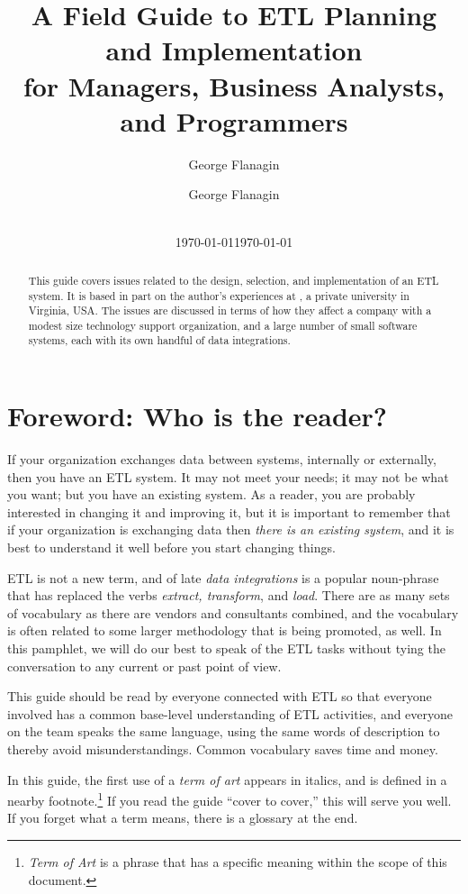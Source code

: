\documentclass[11pt,letterpaper,twosided]{memoir}
\author{George Flanagin}
\date{\today}
\title{A Field Guide to ETL Planning and Implementation\\
\large for Managers, Business Analysts, and Programmers}
\author{George Flanagin\\
\normalsize\lit{gflanagin@richmond.edu}~\lit{me@georgeflanagin.com}}
\date{\today}
\begin{document}
\sloppybottom
\maketitle
\begin{abstract}
This guide covers issues related to the design, selection,
and implementation of an ETL system. It is based in part on the
author's experiences at \UR, a private university in Virginia, USA.
The issues are discussed in terms of how they affect a company
with a modest size technology support organization, and a large
number of small software systems, each with its own handful of 
data integrations. 
\end{abstract}
\newpage
\tableofcontents
\listoffigures
\newpage
\renewcommand\thelinenumber{\color{red}\arabic{linenumber}}
\pagewiselinenumbers
\modulolinenumbers[3]

\frontmatter
\chapter{Foreword: Who is the reader?}
If your organization exchanges data between systems, internally or
externally, then you have an ETL system. It may not meet your needs;
it may not be what you want; but you have an existing system. As
a reader, you are probably interested in changing it and improving
it, but it is important to remember that if your organization is
exchanging data then \emph{there is an existing system}, and it is
best to understand it well before you start changing things.

ETL is not a new term, and of late \emph{data integrations} is a
popular noun-phrase that has replaced the verbs \emph{extract,
transform}, and \emph{load}.  There are as many sets of vocabulary as there
are vendors and consultants combined, and the vocabulary is often
related to some larger methodology that is being promoted, as well.
In this pamphlet, we will do our best to speak of the ETL tasks
without tying the conversation to any current or past point of view.

This guide should be read by everyone connected with
ETL so that everyone involved has a common base-level understanding
of ETL activities, and everyone on the team speaks the same language,
using the same words of description to thereby avoid misunderstandings.
Common vocabulary saves time and money.

In this guide,
the first use of a \emph{term of art} appears in italics, and is
defined in a nearby footnote.\footnote{\emph{Term of Art} is a
phrase that has a specific meaning within the scope of this document.}
If you read the guide ``cover to cover,'' this will serve you well. 
If you forget what a term means, there is a glossary at the end.
\end{document}
